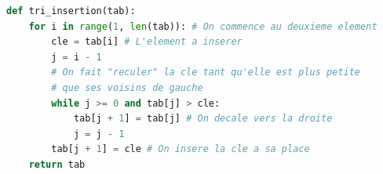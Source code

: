 \documentclass[12pt,a4paper]{report}
\begin{document}
\begin{Comprendre}
\begin{lstlisting}[language=Python]
def tri_insertion(tab):
    for i in range(1, len(tab)): # On commence au deuxieme element
        cle = tab[i] # L'element a inserer
        j = i - 1
        # On fait "reculer" la cle tant qu'elle est plus petite
        # que ses voisins de gauche
        while j >= 0 and tab[j] > cle:
            tab[j + 1] = tab[j] # On decale vers la droite
            j = j - 1
        tab[j + 1] = cle # On insere la cle a sa place
    return tab
\end{lstlisting}
\begin{center}
    
\end{center}
\end{Comprendre}
\end{document}
